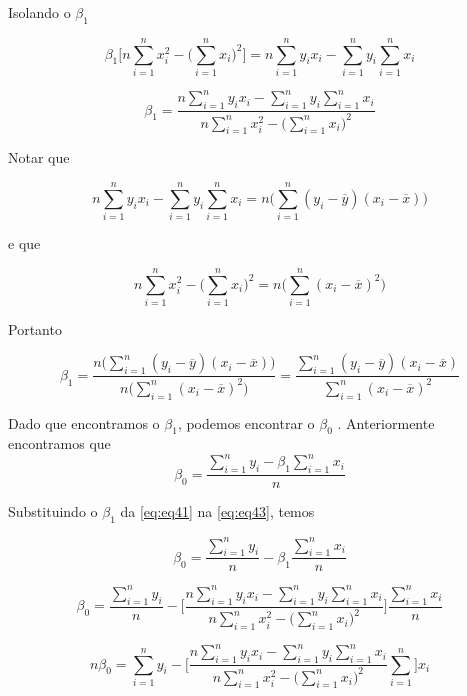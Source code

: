 \noindent Isolando o $\beta_1$

$$\beta_1  \bigg[n\sum_{i=1}^{n}  x_i^{2} - \bigg(\sum_{i=1}^{n}  x_i\bigg)^2 \bigg]   = n\sum_{i=1}^{n}  y_i x_i - \sum_{i=1}^{n}  y_i \sum_{i=1}^{n}  x_i$$

\begin{equation}
\label{eq:eq41}
\beta_1   = \dfrac{n\sum_{i=1}^{n}  y_i x_i - \sum_{i=1}^{n}  y_i \sum_{i=1}^{n}  x_i}{n\sum_{i=1}^{n}  x_i^{2} - \bigg(\sum_{i=1}^{n}  x_i\bigg)^2}
\end{equation}

\noindent Notar que 

$$ n\sum_{i=1}^{n}  y_i x_i - \sum_{i=1}^{n}  y_i \sum_{i=1}^{n}  x_i = n \bigg( \sum_{i=1}^{n} (y_i - \overline{y})(x_i - \overline{x}) \bigg)  $$

\noindent e que 

$$ n\sum_{i=1}^{n}  x_i^{2} - \bigg(\sum_{i=1}^{n}  x_i\bigg)^2 = n \bigg(  \sum_{i=1}^{n} (x_i - \overline{x})^2 \bigg)$$

\noindent Portanto

\begin{equation}
\beta_1 = \dfrac{n \bigg( \sum_{i=1}^{n} (y_i - \overline{y})(x_i - \overline{x}) \bigg)}{n \bigg(  \sum_{i=1}^{n} (x_i - \overline{x})^2 \bigg)} = 
\dfrac{\sum_{i=1}^{n} (y_i - \overline{y})(x_i - \overline{x}) }{\sum_{i=1}^{n} (x_i - \overline{x})^2}
\end{equation}

\noindent Dado que encontramos o $\beta_1$, podemos encontrar o $\beta_0$ . Anteriormente encontramos que 
\begin{equation}
\label{eq:eq45}
    \beta_0 = \dfrac{\sum_{i=1}^{n}  y_i - \beta_1 \sum_{i=1}^{n}  x_i}{n}
\end{equation}

\noindent Substituindo o $\beta_1$ da \autoref{eq:eq41} na \autoref{eq:eq43}, temos

$$ \beta_0 = \dfrac{\sum_{i=1}^{n}  y_i}{n} - \beta_1 \dfrac{\sum_{i=1}^{n}  x_i}{n} $$

$$ \beta_0 = \dfrac{\sum_{i=1}^{n}  y_i}{n} - \Bigg[ \dfrac{n\sum_{i=1}^{n}  y_i x_i - \sum_{i=1}^{n}  y_i \sum_{i=1}^{n}  x_i}{n\sum_{i=1}^{n}  x_i^{2} - \bigg(\sum_{i=1}^{n}  x_i\bigg)^2} \Bigg] \dfrac{\sum_{i=1}^{n}  x_i}{n} $$

$$ n\beta_0 = \sum_{i=1}^{n}  y_i - \Bigg[ \dfrac{n\sum_{i=1}^{n}  y_i x_i - \sum_{i=1}^{n}  y_i \sum_{i=1}^{n}  x_i}{n\sum_{i=1}^{n}  x_i^{2} - \bigg(\sum_{i=1}^{n}  x_i\bigg)^2} \sum_{i=1}^{n}\Bigg]  x_i $$

